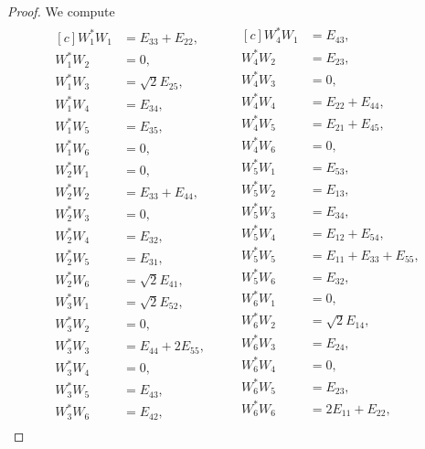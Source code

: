 \documentclass[10pt,reqno]{amsart}
\theoremstyle{definition}
\theoremstyle{plain}
\theoremstyle{remark}
\numberwithin{equation}{section}%
\begin{document}
\begin{proof}
We compute
    \footnotesize 
		\begin{align*}
			\begin{aligned}[c]
				W_1^*W_1&=E_{33}+E_{22},\\
				W_1^*W_2&=0,\\
				W_1^*W_3&=\sqrt{2}E_{25},\\
				W_1^*W_4&=E_{34},\\
				W_1^*W_5&=E_{35},\\
				W_1^*W_6&=0,\\
				W_2^*W_1&=0,\\
				W_2^*W_2&=E_{33}+E_{44},\\
				W_2^*W_3&=0,\\
				W_2^*W_4&=E_{32},\\
				W_2^*W_5&=E_{31},\\
				W_2^*W_6&=\sqrt{2}E_{41},\\
				W_3^*W_1&=\sqrt{2}E_{52},\\
				W_3^*W_2&=0,\\
				W_3^*W_3&=E_{44}+2E_{55},\\
				W_3^*W_4&=0,\\
				W_3^*W_5&=E_{43},\\
				W_3^*W_6&=E_{42},
			\end{aligned}
			\qquad 
			\begin{aligned}[c]
				W_4^*W_1&=E_{43},\\
				W_4^*W_2&=E_{23},\\
				W_4^*W_3&=0,\\
				W_4^*W_4&=E_{22}+E_{44},\\
				W_4^*W_5&=E_{21}+E_{45},\\
				W_4^*W_6&=0,\\
				W_5^*W_1&=E_{53},\\
				W_5^*W_2&=E_{13},\\
				W_5^*W_3&=E_{34},\\
				W_5^*W_4&=E_{12}+E_{54},\\
				W_5^*W_5&=E_{11}+E_{33}+E_{55},\\
				W_5^*W_6&=E_{32},\\
				W_6^*W_1&=0,\\
				W_6^*W_2&=\sqrt{2}E_{14},\\
				W_6^*W_3&=E_{24},\\
				W_6^*W_4&=0,\\
				W_6^*W_5&=E_{23},\\
				W_6^*W_6&=2E_{11}+E_{22},\\

\end{aligned}
\end{align*}
\end{proof}
\end{document}
